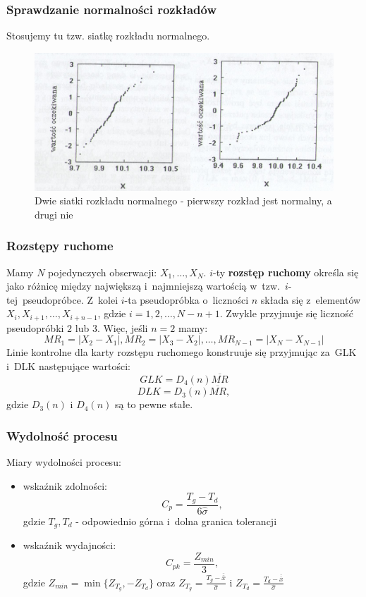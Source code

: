 \documentclass[11pt,usenames,dvipsnames,svgnames,x11names]{beamer}
\theoremstyle{plain}
\theoremstyle{definition}
\theoremstyle{remark}
\begin{document}
\begin{frame}
\frametitle{Sprawdzanie normalności rozkładów}

Stosujemy tu tzw. siatkę rozkładu normalnego.

\begin{center}
	\begin{figure}[htbp]
			\includegraphics[width=\textwidth]{obr5.png}
			\caption{Dwie siatki rozkładu normalnego - pierwszy rozkład jest normalny, a drugi nie}
	\end{figure}
\end{center}
\end{frame}

\begin{frame}
\frametitle{Rozstępy ruchome}

Mamy $N$ pojedynczych obserwacji: $X_1,\ldots,X_N$. $i$-ty \textbf{rozstęp ruchomy} określa się jako różnicę między największą i~najmniejszą wartością w~tzw.~$i$-tej~pseudopróbce. Z~kolei $i$-ta pseudopróbka o~liczności $n$ składa się z~elementów $X_i,X_{i+1},\ldots,X_{i+n-1}$, gdzie $i=1,2,\ldots,N-n+1$. Zwykle przyjmuje się liczność pseudopróbki $2$ lub $3$. Więc, jeśli $n=2$ mamy:
$$MR_1=|X_2-X_1|, MR_2=|X_3-X_2|,\ldots,MR_{N-1}=|X_N-X_{N-1}|$$
Linie kontrolne dla karty rozstępu ruchomego konstruuje się przyjmując za~GLK i~DLK następujące wartości:
$$GLK=D_4(n)\overline{MR}$$
$$DLK=D_3(n)\overline{MR},$$
gdzie $D_3(n)$ i $D_4(n)$ są to pewne stałe.

\end{frame}

\begin{frame}
\frametitle{Wydolność procesu}

Miary wydolności procesu:
\begin{itemize}
\item wskaźnik zdolności: $$C_p=\frac{T_g-T_d}{6\hat{\sigma}},$$ gdzie $T_g, T_d$ - odpowiednio górna i~dolna granica tolerancji
\item wskaźnik wydajności: $$C_{pk}=\frac{Z_{min}}{3},$$ gdzie $Z_{min}=\min\lbrace Z_{T_g},-Z_{T_d}\rbrace$ oraz $Z_{T_g}=\frac{T_g-\overline{\overline{x}}}{\hat{\sigma}}$ i $Z_{T_d}=\frac{T_d-\overline{\overline{x}}}{\hat{\sigma}}$
\end{itemize}


\end{frame}
\end{document}
